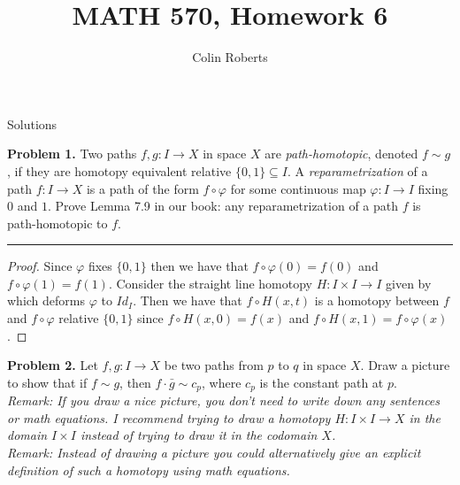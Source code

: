 \documentclass[leqno]{article}
\author{Colin Roberts}
\title{MATH 570, Homework 6}
\theoremstyle{nonumberplain}
\newtheorem{proof}{Proof}
\begin{document}
\maketitle
\begin{large}
\begin{center}
Solutions
\end{center}
\end{large}
\pagebreak


\noindent\textbf{Problem 1.}  Two paths $f,g\colon I \to X$ in space $X$ are \emph{path-homotopic}, denoted $f\sim g$, if they are homotopy equivalent relative $\{0,1\}\subseteq I$. A \emph{reparametrization} of a path $f\colon I\to X$ is a path of the form $f\circ \varphi$ for some continuous map $\varphi \colon I\to I$ fixing $0$ and $1$. Prove Lemma 7.9 in our book: any reparametrization of a path $f$ is path-homotopic to $f$.

\noindent\rule[0.5ex]{\linewidth}{1pt}

\begin{proof}
Since $\varphi$ fixes $\{0,1\}$ then we have that $f\circ \varphi(0)=f(0)$ and $f\circ \varphi (1)=f(1)$.  Consider the straight line homotopy $H\colon I \times I \to I$ given by which deforms $\varphi$ to $Id_I$.  Then we have that $f\circ H(x,t)$ is a homotopy between $f$ and $f\circ \varphi$ relative $\{0,1\}$ since $f\circ H(x,0)=f(x)$ and $f\circ H(x,1)=f\circ \varphi(x)$.
\end{proof}

\pagebreak



\noindent\textbf{Problem 2.} Let $f,g\colon I\to X$ be two paths from $p$ to $q$ in space $X$. Draw a picture to show that if $f\sim g$, then $f\cdot \bar{g} \sim c_p$, where $c_p$ is the constant path at $p$.\\
\noindent \emph{Remark: If you draw a nice picture, you don't need to write down any sentences or math equations. I recommend trying to draw a homotopy $H\colon I\times I \to X$ in the domain $I\times I$ instead of trying to draw it in the codomain $X$.}\\
\noindent \emph{Remark: Instead of drawing a picture you could alternatively give an explicit definition of such a homotopy using math equations.}
\end{document}
